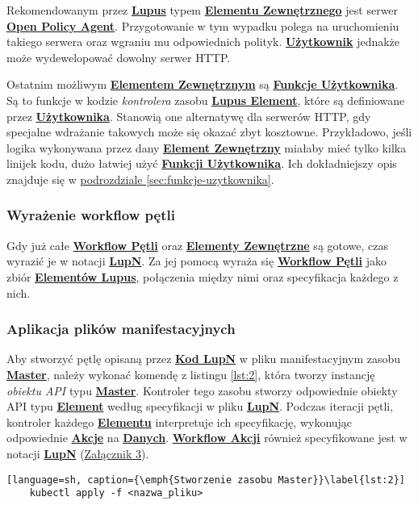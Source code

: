 Rekomendowanym przez \hyperlink{def:lupus}{\textbf{Lupus}} typem \hyperlink{def:element-zewnetrzny}{\textbf{Elementu Zewnętrznego}} jest serwer \hyperlink{def:opa}{\textbf{Open Policy Agent}}. Przygotowanie w tym wypadku polega na uruchomieniu takiego serwera oraz wgraniu mu odpowiednich polityk. \hyperlink{def:uzytkownik}{\textbf{Użytkownik}} jednakże może wydewelopować dowolny serwer HTTP.

Ostatnim możliwym \hyperlink{def:element-zewnetrzny}{\textbf{Elementem Zewnętrznym}} są \hyperlink{def:funkcje-uzytkownika}{\textbf{Funkcje Użytkownika}}. Są to funkcje w kodzie \textit{kontrolera} zasobu \hyperlink{def:element-lupus}{\textbf{Lupus Element}}, które są definiowane przez \hyperlink{def:uzytkownik}{\textbf{Użytkownika}}. Stanowią one alternatywę dla serwerów HTTP, gdy specjalne wdrażanie takowych może się okazać zbyt kosztowne. Przykładowo, jeśli logika wykonywana przez dany \hyperlink{def:element-zewnetrzny}{\textbf{Element Zewnętrzny}} miałaby mieć tylko kilka linijek kodu, dużo łatwiej użyć \hyperlink{def:funkcje-uzytkownika}{\textbf{Funkcji Użytkownika}}. Ich dokładniejszy opis znajduje się w \hyperref[sec:funkcje-uzytkownika]{podrozdziale \ref{sec:funkcje-uzytkownika}}.


\subsubsection{Wyrażenie workflow pętli}

Gdy już całe \hyperlink{def:workflow-petli}{\textbf{Workflow Pętli}} oraz \hyperlink{def:element-zewnetrzny}{\textbf{Elementy Zewnętrzne}} są gotowe, czas wyrazić je w notacji \hyperlink{def:lupn}{\textbf{LupN}}. Za jej pomocą wyraża się \hyperlink{def:workflow-petli}{\textbf{Workflow Pętli}} jako zbiór \hyperlink{def:element-lupus}{\textbf{Elementów Lupus}}, połączenia między nimi oraz specyfikacja każdego z nich.

\subsubsection{Aplikacja plików manifestacyjnych}

Aby stworzyć pętlę opisaną przez \hyperlink{def:kod-lupn}{\textbf{Kod LupN}} w pliku manifestacyjnym zasobu \hyperlink{def:master}{\textbf{Master}}, należy wykonać komendę z listingu \ref{lst:2}, która tworzy instancję \textit{obiektu API} typu \hyperlink{def:master}{\textbf{Master}}. Kontroler tego zasobu stworzy odpowiednie obiekty API typu \hyperlink{def:element}{\textbf{Element}} według specyfikacji w pliku \hyperlink{def:plik-lupn}{\textbf{LupN}}. Podczas iteracji pętli, kontroler każdego \hyperlink{def:element}{\textbf{Elementu}} interpretuje ich specyfikację, wykonując odpowiednie \hyperlink{def:akcja}{\textbf{Akcje}} na \hyperlink{def:dane}{\textbf{Danych}}. \hyperlink{def:workflow-petli}{\textbf{Workflow Akcji}} również specyfikowane jest w notacji \hyperlink{def:lupn}{\textbf{LupN}} (\hyperref[appendix:3]{Załącznik 3}).

\begin{lstlisting}[language=sh, caption={\emph{Stworzenie zasobu Master}}\label{lst:2}]
    kubectl apply -f <nazwa_pliku>
\end{lstlisting}
